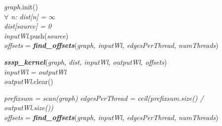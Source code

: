 \begin{algorithm}[t]
\begin{small}

\label{offset-line} 

\BlankLine
\textit{graph}.init()\\
\textit{$\forall$ n: dist[n] = $\infty$} \\
\textit{dist[source] = 0} \\
\textit{inputWl}.push(\textit{source}) \\

\textit{offsets} = \textbf{\textit{find\_offsets}}(\textit{graph, inputWl, edgesPerThread, numThreads}) \label{getoffset-line-1} \\

\BlankLine
{} {
   \textbf{\textit{sssp\_kernel}}(\textit{graph, dist, inputWl, outputWl, offsets}) \\
   \textit{inputWl = outputWl} \\ 
   \textit{outputWl}.clear() \\
   \BlankLine

   \textit{prefixsum = scan(\textit{graph})}	\label{prefixsum-line}	
   \textit{edgesPerThread = ceil(prefixsum.size() / outputWl.size())} \\
   \textit{offsets} = \textbf{\textit{find\_offsets}}(\textit{graph, inputWl, edgesPerThread, numThreads}) \label{getoffset-line-2} \\
}


\end{small}
\end{algorithm}
